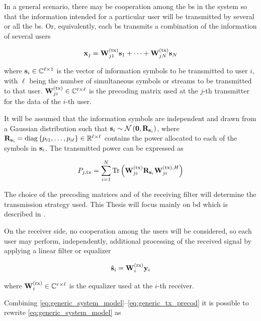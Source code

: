 In a general scenario, there may be cooperation among the \gls{bs} in the system
so that the information intended for a particular user will be transmitted by
several or all the \gls{bs}. Or, equivalently, each \gls{bs} transmits a
combination of the information of several users

\begin{equation} \label{eq:generic_tx_precod}
    \xx_j = \Wtx_{j1} \ss_1 + \cdots + \Wtx_{jN} \ss_N
\end{equation}

\noindent
where $\ss_i \in \C^{\ell \times 1}$ is the vector of information symbols to be
transmitted to user $i$, with $\ell$ being the number of simultaneous symbols or
streams to be transmitted to that user. $\Wtx_{ji} \in \C^{t \times \ell}$ is
the precoding matrix used at the $j$-th transmitter for the data of the
$i$-th user.

It will be assumed that the information symbols are independent and drawn from a
Gaussian distribution such that $\ss_i \sim \mathcal{N}\left(\zero, \RR_{\ss_i}
\right)$, where $\RR_{\ss_i} = \diag\left\{p_{i1}, \ldots, p_{i\ell}\right\} \in
\R^{\ell \times \ell}$ contains the power allocated to each of the symbols in
$\ss_i$. The transmitted power can be expressed as

\begin{equation} \label{eq:bs_precod_power}
    P_{j, \tx} = \sum\limits_{i=1}^{N} \Tr \left( \Wtx_{ji} \RR_{\ss_i}
    \WtxH_{ji} \right)
\end{equation}

The choice of the precoding matrices and of the receiving filter will determine
the transmission strategy used. This Thesis will focus mainly on \gls{bd}
\cite{spencer04} which is described in .

On the receiver side, no cooperation among the users will be considered, so each
user may perform, independently, additional processing of the received signal by
applying a linear filter or equalizer

\begin{equation} \label{eq:generic_rx_eq}
    \hat{\ss}_i = \Wrx_i \yy_i
\end{equation}

\noindent
where $\Wrx_i \in \C^{r \times \ell}$ is the equalizer used at the $i$-th
receiver.

Combining \eqref{eq:generic_system_model}--\eqref{eq:generic_tx_precod} it is
possible to rewrite \eqref{eq:generic_system_model} as


